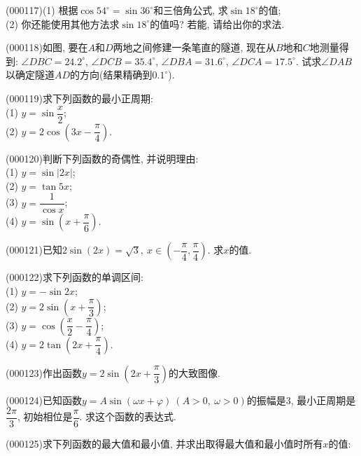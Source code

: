 \item (000117)(1) 根据$\cos 54^\circ=\sin 36^\circ$和三倍角公式, 求$\sin 18^\circ$的值;\\
(2) 你还能使用其他方法求$\sin 18^\circ$的值吗? 若能, 请给出你的求法.
\item (000118)如图, 要在$A$和$D$两地之间修建一条笔直的隧道, 现在从$B$地和$C$地测量得到: $\angle DBC=24.2^\circ$, $\angle DCB=35.4^\circ$, $\angle DBA=31.6^\circ$, $\angle DCA=17.5^\circ$. 试求$\angle DAB$以确定隧道$AD$的方向(结果精确到$0.1^\circ$).
\begin{center}
\end{center}
\item (000119)求下列函数的最小正周期:\\
(1) $y=\sin \dfrac x2$;\\
(2) $y=2\cos (3x-\dfrac \pi 4)$.
\item (000120)判断下列函数的奇偶性, 并说明理由:\\
(1) $y=\sin |2x|$;\\
(2) $y=\tan 5x$;\\
(3) $y= \dfrac1 {\cos x}$;\\
(4) $y=\sin (x+\dfrac\pi 6)$.
\item (000121)已知$2\sin (2x)=\sqrt 3, \ x\in (-\dfrac \pi 4, \dfrac\pi 4)$. 求$x$的值.
\item (000122)求下列函数的单调区间:\\
(1) $y=-\sin 2x$;\\
(2) $y=2\sin (x+\dfrac\pi 3)$;\\
(3) $y=\cos (\dfrac x2-\dfrac \pi 4)$;\\
(4) $y=2\tan (2x+\dfrac \pi 4)$.
\item (000123)作出函数$y=2\sin (2x+\dfrac \pi 3)$的大致图像.
\item (000124)已知函数$y=A\sin (\omega x+\varphi) \ (A>0, \ \omega>0)$的振幅是$3$, 最小正周期是$\dfrac{2\pi} 3$, 初始相位是$\dfrac\pi 6$. 求这个函数的表达式.
\item (000125)求下列函数的最大值和最小值, 并求出取得最大值和最小值时所有$x$的值:\\
